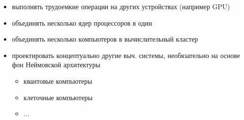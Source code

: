 {{      \vspace{0.5cm}
      \begin{itemize}
        \item выполнять трудоемкие операции на других устройствах (например GPU)
        \item объединять несколько ядер процессоров в один
        \item объединять несколько компьютеров в вычислительный кластер
        \item проектировать концептуально другие выч. системы, необязательно на основе фон Неймовской архитектуры
        \begin{itemize}
          \item квантовые компьютеры
          \item клеточные компьютеры
          \item ...
        \end{itemize}
      \end{itemize}
    }



}
